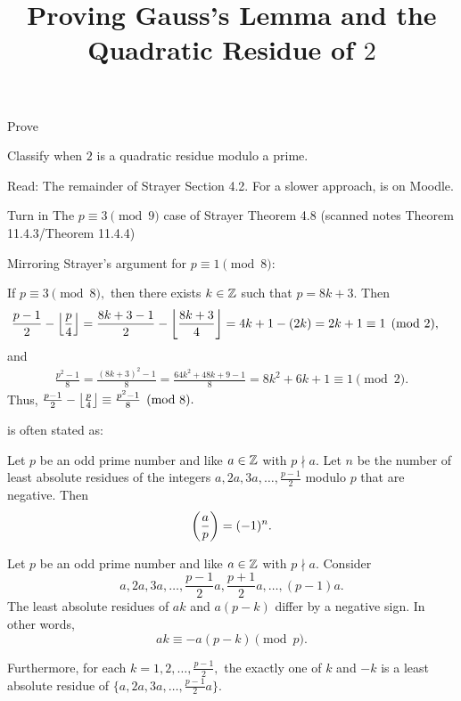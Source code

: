 \documentclass{ximera}
\title{Proving Gauss's Lemma and the Quadratic Residue of $2$}
\begin{document}
\begin{abstract}
\end{abstract}
\maketitle

\begin{obj}
    \item Prove 
	\item Classify when $2$ is a quadratic residue modulo a prime.
\end{obj}


\begin{pre}
    \item[Read:] The remainder of Strayer Section 4.2. For a slower approach, \cite{theo-gauss-lem} 
	is on Moodle.
    \item[Turn in] The $p\equiv 3\pmod{9}$
	 case of Strayer Theorem 4.8 (scanned notes Theorem 11.4.3/Theorem 11.4.4)

	 \begin{solution}
		Mirroring Strayer's argument for $p\equiv 1\pmod{8}:$

		If $p\equiv 3\pmod{8},$ then there exists $k\in\mathbb Z$ such that $p=8k+3.$ Then 
			\begin{align*}
				\frac{p-1}{2}-\left\lfloor  \frac{p}{4}\right\rfloor
				&=\frac{8k+3-1}{2}-\left\lfloor \frac{8k+3}{4}\right\rfloor
				=4k+1-(2k)=2k+1
				\equiv 1\pmod{2},
			\end{align*}
		and 
			\begin{align*}
				\frac{p^2-1}{8}=\frac{(8k+3)^2-1}{8}=\frac{64k^2+48k+9-1}{8}=8k^2+6k+1\equiv 1\pmod{2}.
			\end{align*}
		Thus, $\frac{p-1}{2}-\left\lfloor  \frac{p}{4}\right\rfloor\equiv \frac{p^2-1}{8}\pmod{8}.$
	 \end{solution}
\end{pre}


\begin{remark}
	 is often stated as:

	Let $p$ be an odd prime number and like $a\in\mathbb Z$ with $p\nmid a$. Let $n$ be the number of least absolute residues of the integers $a,2a,3a,\dots,\frac{p-1}{2}$ modulo $p$ that are negative. Then \[\left(\frac{a}{p}\right)=(-1)^n.\]
\end{remark}


\begin{lemma}\label{lem:residues-gauss-lem}
	Let $p$ be an odd prime number and like $a\in\mathbb Z$ with $p\nmid a.$ Consider  
	\[a,2a,3a,\dots,\frac{p-1}{2}a,\frac{p+1}{2}a,\dots,(p-1)a.\] The least absolute residues of $ak$ and $a(p-k)$ differ by a negative sign. In other words, 
	\[ak\equiv -a(p-k)\pmod{p}.\]
	
	Furthermore, for each $k=1,2,\dots,\frac{p-1}{2},$ the exactly one of $k$ and $-k$ is a least absolute residue of $\{a,2a,3a,\dots,\frac{p-1}{2}a\}.$
\end{lemma}
\end{document}
